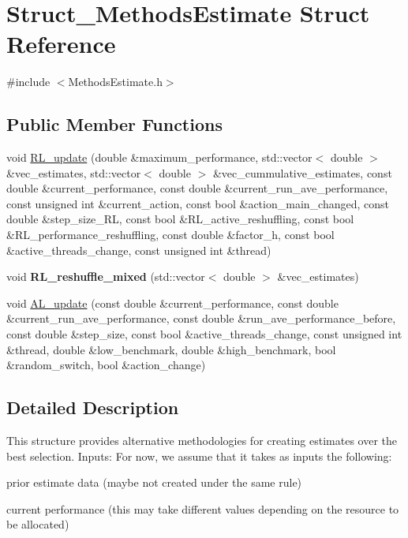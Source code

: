 \hypertarget{structStruct__MethodsEstimate}{\section{Struct\-\_\-\-Methods\-Estimate Struct Reference}
\label{structStruct__MethodsEstimate}
}


{\ttfamily \#include $<$Methods\-Estimate.\-h$>$}

\subsection*{Public Member Functions}
\begin{DoxyCompactItemize}
\item 
void \hyperlink{structStruct__MethodsEstimate_a79b0089392ec35169c185f465f88b675}{R\-L\-\_\-update} (double \&maximum\-\_\-performance, std\-::vector$<$ double $>$ \&vec\-\_\-estimates, std\-::vector$<$ double $>$ \&vec\-\_\-cummulative\-\_\-estimates, const double \&current\-\_\-performance, const double \&current\-\_\-run\-\_\-ave\-\_\-performance, const unsigned int \&current\-\_\-action, const bool \&action\-\_\-main\-\_\-changed, const double \&step\-\_\-size\-\_\-\-R\-L, const bool \&R\-L\-\_\-active\-\_\-reshuffling, const bool \&R\-L\-\_\-performance\-\_\-reshuffling, const double \&factor\-\_\-h, const bool \&active\-\_\-threads\-\_\-change, const unsigned int \&thread)
\item 
\hypertarget{structStruct__MethodsEstimate_a13f8ba793252f8883a1769dbee5ddaaa}{void {\bfseries R\-L\-\_\-reshuffle\-\_\-mixed} (std\-::vector$<$ double $>$ \&vec\-\_\-estimates)}\label{structStruct__MethodsEstimate_a13f8ba793252f8883a1769dbee5ddaaa}

\item 
void \hyperlink{structStruct__MethodsEstimate_a81e63589cf2c8a3f83fbef1a16491aea}{A\-L\-\_\-update} (const double \&current\-\_\-performance, const double \&current\-\_\-run\-\_\-ave\-\_\-performance, const double \&run\-\_\-ave\-\_\-performance\-\_\-before, const double \&step\-\_\-size, const bool \&active\-\_\-threads\-\_\-change, const unsigned int \&thread, double \&low\-\_\-benchmark, double \&high\-\_\-benchmark, bool \&random\-\_\-switch, bool \&action\-\_\-change)
\end{DoxyCompactItemize}


\subsection{Detailed Description}
This structure provides alternative methodologies for creating estimates over the best selection. Inputs\-: For now, we assume that it takes as inputs the following\-:
\begin{DoxyItemize}
\item prior estimate data (maybe not created under the same rule)
\item current performance (this may take different values depending on the resource to be allocated) 
\end{DoxyItemize}


